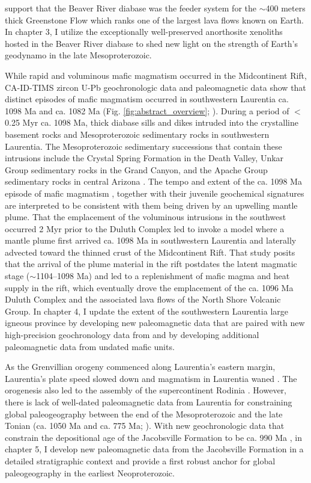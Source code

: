 support that the Beaver River diabase was the feeder system for the $\sim$400 meters thick Greenstone Flow which ranks one of the largest lava flows known on Earth. In chapter 3, I utilize the exceptionally well-preserved anorthosite xenoliths hosted in the Beaver River diabase to shed new light on the strength of Earth's geodynamo in the late Mesoproterozoic.

While rapid and voluminous mafic magmatism occurred in the Midcontinent Rift, CA-ID-TIMS zircon U-Pb geochronologic data and paleomagnetic data show that distinct episodes of mafic magmatism occurred in southwestern Laurentia ca. 1098 Ma and ca. 1082 Ma (Fig. \ref{fig:abstract_overview}; \citealp{Mohr2024a}). During a period of $<$0.25 Myr ca. 1098 Ma, thick diabase sills and dikes intruded into the crystalline basement rocks and Mesoproterozoic sedimentary rocks in southwestern Laurentia. The Mesoproterozoic sedimentary successions that contain these intrusions include the Crystal Spring Formation in the Death Valley, Unkar Group sedimentary rocks in the Grand Canyon, and the Apache Group sedimentary rocks in central Arizona \citep{Bright2014a}. The tempo and extent of the ca. 1098 Ma episode of mafic magmatism \citep{Mohr2024a}, together with their juvenile geochemical signatures \citep{Hammond1990a, Bright2014a} are interpreted to be consistent with them being driven by an upwelling mantle plume. That the emplacement of the voluminous intrusions in the southwest occurred 2 Myr prior to the Duluth Complex led \cite{Mohr2024a} to invoke a model where a mantle plume first arrived ca. 1098 Ma in southwestern Laurentia and laterally advected toward the thinned crust of the Midcontinent Rift. That study posits that the arrival of the plume material in the rift postdates the latent magmatic stage ($\sim$1104--1098 Ma) and led to a replenishment of mafic magma and heat supply in the rift, which eventually drove the emplacement of the ca. 1096 Ma Duluth Complex and the associated lava flows of the North Shore Volcanic Group. In chapter 4, I update the extent of the southwestern Laurentia large igneous province by developing new paleomagnetic data that are paired with new high-precision geochronology data from \cite{Mohr2024a} and by developing additional paleomagnetic data from undated mafic units. 

As the Grenvillian orogeny commenced along Laurentia's eastern margin, Laurentia's plate speed slowed down and magmatism in Laurentia waned \citep{Swanson-Hysell2019a}. The orogenesis also led to the assembly of the supercontinent Rodinia \citep{Swanson-Hysell2023a}. However, there is lack of well-dated paleomagnetic data from Laurentia for constraining global paleogeography between the end of the Mesoproterozoic and the late Tonian (ca. 1050 Ma and ca. 775 Ma; \citealp{Swanson-Hysell2023a, Eyster2019a}). With new geochronologic data that constrain the depositional age of the Jacobsville Formation to be ca. 990 Ma \citep{Hodgin2022a}, in chapter 5, I develop new paleomagnetic data from the Jacobsville Formation in a detailed stratigraphic context and provide a first robust anchor for global paleogeography in the earliest Neoproterozoic. 

